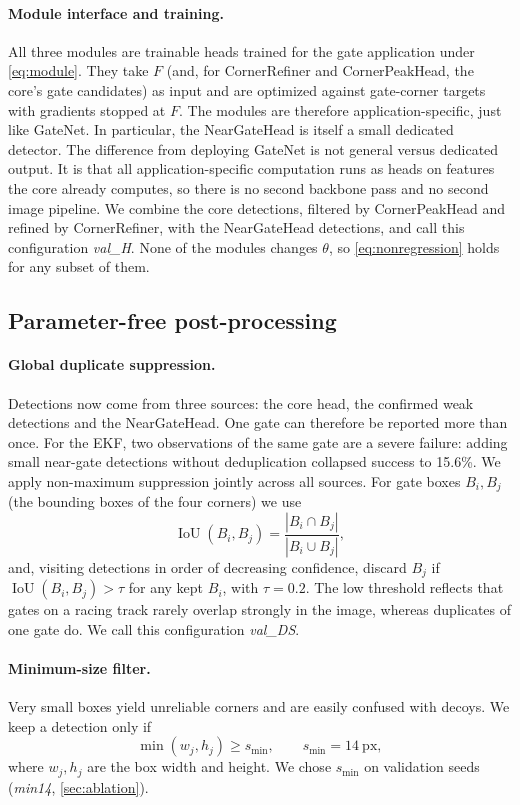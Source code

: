\documentclass[10pt,twocolumn,letterpaper]{article}
\begin{document}
\paragraph{Module interface and training.}
All three modules are trainable heads trained for the gate application under \cref{eq:module}. They take $F$ (and, for CornerRefiner and CornerPeakHead, the core's gate candidates) as input and are optimized against gate-corner targets with gradients stopped at $F$. The modules are therefore application-specific, just like GateNet. In particular, the NearGateHead is itself a small dedicated detector. The difference from deploying GateNet is not general versus dedicated output. It is that all application-specific computation runs as heads on features the core already computes, so there is no second backbone pass and no second image pipeline. We combine the core detections, filtered by CornerPeakHead and refined by CornerRefiner, with the NearGateHead detections, and call this configuration \emph{val\_H}. None of the modules changes $\theta$, so \cref{eq:nonregression} holds for any subset of them.

\subsection{Parameter-free post-processing}
\label{sec:postproc}
\paragraph{Global duplicate suppression.}
Detections now come from three sources: the core head, the confirmed weak detections and the NearGateHead. One gate can therefore be reported more than once. For the EKF, two observations of the same gate are a severe failure: adding small near-gate detections without deduplication collapsed success to 15.6\%. We apply non-maximum suppression jointly across all sources. For gate boxes $B_i, B_j$ (the bounding boxes of the four corners) we use
\begin{equation}
  \operatorname{IoU}(B_i, B_j) = \frac{|B_i \cap B_j|}{|B_i \cup B_j|},
  \label{eq:iou}
\end{equation}
and, visiting detections in order of decreasing confidence, discard $B_j$ if $\operatorname{IoU}(B_i, B_j) > \tau$ for any kept $B_i$, with $\tau = 0.2$. The low threshold reflects that gates on a racing track rarely overlap strongly in the image, whereas duplicates of one gate do. We call this configuration \emph{val\_DS}.

\paragraph{Minimum-size filter.}
Very small boxes yield unreliable corners and are easily confused with decoys. We keep a detection only if
\begin{equation}
  \min(w_j, h_j) \geq s_{\min}, \qquad s_{\min} = 14\ \text{px},
  \label{eq:minsize}
\end{equation}
where $w_j, h_j$ are the box width and height. We chose $s_{\min}$ on validation seeds (\emph{min14}, \cref{sec:ablation}).
\end{document}
